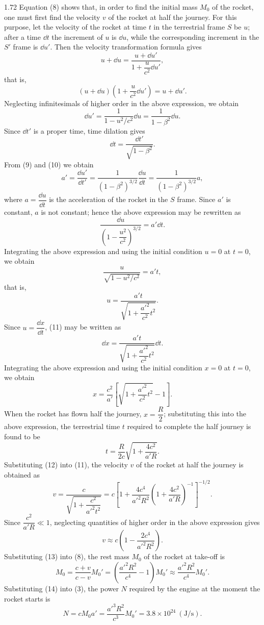 \begin{solution}{1.72}
Equation (8) shows that, in order to find the initial mass $M_0$ of the rocket, one must first find the velocity $v$ of the rocket at half the journey. For this purpose, let the velocity of the rocket at time $t$ in the terrestrial frame $S$ be $u$; after a time $\dd t$ the increment of $u$ is $\dd u$, while the corresponding increment in the $S'$ frame is $\dd u'$. Then the velocity transformation formula gives
\[
u+\dd u=\frac{u+\dd u'}{1+\dfrac{u}{c^2}\dd u'},
\]
that is,
\[
(u+\dd u)\left(1+\frac{u}{c^2}\dd u'\right)=u+\dd u'.
\]
Neglecting infinitesimals of higher order in the above expression, we obtain
\begin{equation}
\dd u'=\frac{1}{1-u^2/c^2}\dd u=\frac{1}{1-\beta^2}\dd u. \tag{9}
\end{equation}
Since $\dd t'$ is a proper time, time dilation gives
\begin{equation}
\dd t=\frac{\dd t'}{\sqrt{1-\beta^2}}. \tag{10}
\end{equation}
From (9) and (10) we obtain
\[
a'=\frac{\dd u'}{\dd t'}=\frac{1}{(1-\beta^2)^{3/2}}\frac{\dd u}{\dd t}
=\frac{1}{(1-\beta^2)^{3/2}}a,
\]
where $a=\dfrac{\dd u}{\dd t}$ is the acceleration of the rocket in the $S$ frame. Since $a'$ is constant, $a$ is not constant; hence the above expression may be rewritten as
\[
\frac{\dd u}{\left(1-\dfrac{u^2}{c^2}\right)^{3/2}}=a'\dd t.
\]
Integrating the above expression and using the initial condition $u=0$ at $t=0$, we obtain
\[
\frac{u}{\sqrt{1-u^2/c^2}}=a't,
\]
that is,
\begin{equation}
u=\frac{a't}{\sqrt{1+\dfrac{a'^2}{c^2}t^2}}. \tag{11}
\end{equation}
Since $u=\dfrac{\dd x}{\dd t}$, (11) may be written as
\[
\dd x=\frac{a't}{\sqrt{1+\dfrac{a'^2}{c^2}t^2}}\dd t.
\]
Integrating the above expression and using the initial condition $x=0$ at $t=0$, we obtain
\[
x=\frac{c^2}{a'}\left[\sqrt{1+\frac{a'^2}{c^2}t^2}-1\right].
\]
When the rocket has flown half the journey, $x=\dfrac{R}{2}$; substituting this into the above expression, the terrestrial time $t$ required to complete the half journey is found to be
\begin{equation}
t=\frac{R}{2c}\sqrt{1+\frac{4c^2}{a'R}}. \tag{12}
\end{equation}
Substituting (12) into (11), the velocity $v$ of the rocket at half the journey is obtained as
\[
v=\frac{c}{\sqrt{1+\dfrac{c^2}{a'^2t^2}}}
=c\left[1+\frac{4c^4}{a'^2R^2}\left(1+\frac{4c^2}{a'R}\right)^{-1}\right]^{-1/2}.
\]
Since $\dfrac{c^2}{a'R}\ll1$, neglecting quantities of higher order in the above expression gives
\begin{equation}
v\approx c\left(1-\frac{2c^4}{a'^2R^2}\right). \tag{13}
\end{equation}
Substituting (13) into (8), the rest mass $M_0$ of the rocket at take-off is
\begin{equation}
M_0=\frac{c+v}{c-v}M_0'=\left(\frac{a'^2R^2}{c^4}-1\right)M_0'
\approx\frac{a'^2R^2}{c^4}M_0'. \tag{14}
\end{equation}
Substituting (14) into (3), the power $N$ required by the engine at the moment the rocket starts is
\[
N=cM_0a'=\frac{a'^3R^2}{c^3}M_0'=3.8\times10^{24}\ (\mathrm{J/s}).
\]
\end{solution}

